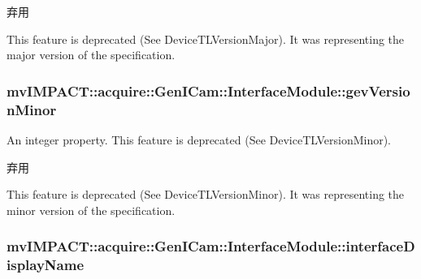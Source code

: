 \begin{DoxyRefDesc}{弃用}
\item[\hyperlink{deprecated__deprecated000097}{弃用}]This feature is deprecated (See Device\+T\+L\+Version\+Major). It was representing the major version of the specification. \end{DoxyRefDesc}
\hypertarget{classmv_i_m_p_a_c_t_1_1acquire_1_1_gen_i_cam_1_1_interface_module_ac9400d7c200c444e2788da0cbc87d7ec}{
\subsubsection[{gev\+Version\+Minor}]{ mv\+I\+M\+P\+A\+C\+T\+::acquire\+::\+Gen\+I\+Cam\+::\+Interface\+Module\+::gev\+Version\+Minor}}\label{classmv_i_m_p_a_c_t_1_1acquire_1_1_gen_i_cam_1_1_interface_module_ac9400d7c200c444e2788da0cbc87d7ec}


An integer property. This feature is deprecated (See Device\+T\+L\+Version\+Minor). 

\begin{DoxyRefDesc}{弃用}
\item[\hyperlink{deprecated__deprecated000098}{弃用}]This feature is deprecated (See Device\+T\+L\+Version\+Minor). It was representing the minor version of the specification. \end{DoxyRefDesc}
\hypertarget{classmv_i_m_p_a_c_t_1_1acquire_1_1_gen_i_cam_1_1_interface_module_ac291438ff28ee97dafc491f6b16c811a}{
\subsubsection[{interface\+Display\+Name}]{ mv\+I\+M\+P\+A\+C\+T\+::acquire\+::\+Gen\+I\+Cam\+::\+Interface\+Module\+::interface\+Display\+Name}}\label{classmv_i_m_p_a_c_t_1_1acquire_1_1_gen_i_cam_1_1_interface_module_ac291438ff28ee97dafc491f6b16c811a}


